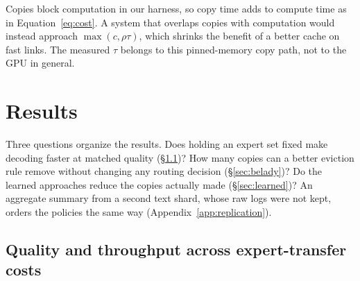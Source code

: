 \documentclass{article}
\newcommand{\xf}{\ensuremath{\rho}}
\begin{document}
Copies block computation in our harness, so copy time adds to compute time as
in Equation~\eqref{eq:cost}. A system that overlaps copies with computation
would instead approach $\max(c,\xf\tau)$, which shrinks the benefit of a better
cache on fast links. The measured $\tau$ belongs to this pinned-memory copy
path, not to the GPU in general.

\vspace{-4pt}

\section{Results}

\label{sec:results}

\vspace{-2pt}

Three questions organize the results. Does holding an expert set fixed make
decoding faster at matched quality (\S\ref{sec:tau})? How many copies can a
better eviction rule remove without changing any routing decision
(\S\ref{sec:belady})? Do the learned approaches reduce the copies actually made
(\S\ref{sec:learned})? An aggregate summary from a second text shard, whose raw
logs were not kept, orders the policies the same way
(Appendix~\ref{app:replication}).
\vspace{-3pt}

\subsection{Quality and throughput across expert-transfer costs}

\label{sec:tau}
\end{document}
